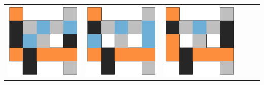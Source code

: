 \begin{tabular}{cccccc}
    \hline \rule{0pt}{9ex}  
    \includegraphics[scale=0.1]{images/top_designs/carrier/ga/exp5/gen29_ind0} &
    \includegraphics[scale=0.1]{images/top_designs/carrier/ga/exp5/gen29_ind1} &
    \includegraphics[scale=0.1]{images/top_designs/carrier/ga/exp5/gen29_ind2} &

\end{tabular}
